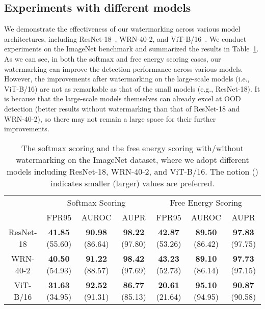 \documentclass{article}
\begin{document}
\subsection{Experiments with different models}

{We demonstrate the effectiveness of our watermarking across various model architectures, including ResNet-18~\cite{he2016deep}, WRN-40-2, and ViT-B/16~\cite{DosovitskiyB0WZ21}. We conduct experiments on the ImageNet benchmark and summarized the results in Table~\ref{tab: vit}. As we can see, in both the softmax and free energy scoring cases, our watermarking can improve the detection performance across various models. However, the improvements after watermarking on the large-scale models (i.e., ViT-B/16) are not as remarkable as that of the small models (e.g., ResNet-18). It is because that the large-scale models themselves can already excel at OOD detection (better results without watermarking than that of ResNet-18 and WRN-40-2), so there may not remain a large space for their further improvements. }

\begin{table}[]
\centering
\caption{{The softmax scoring and the free energy scoring with/without watermarking on the ImageNet dataset, where we adopt different models including ResNet-18, WRN-40-2, and ViT-B/16. The notion  () indicates smaller (larger) values are preferred.}} \label{tab: vit}
\scriptsize{
\begin{tabular}{c|ccc|ccc}
\toprule[1.5pt]
\multicolumn{1}{c|}{\multirow{2}{*}{}} & \multicolumn{3}{c|}{Softmax Scoring}           & \multicolumn{3}{c}{Free Energy Scoring}                   \\
\cline{2-7}
\multicolumn{1}{c|}{}                  & FPR95          & AUROC         & AUPR          & FPR95   & AUROC         & AUPR          \\
\midrule[1pt]
ResNet-18                             & \textbf{41.85} (55.60) & \textbf{90.98} (86.64) & \textbf{98.22} (97.80) & \textbf{42.87} (53.26)             & \textbf{89.50} (86.42) & \textbf{97.83} (97.75) \\
WRN-40-2                              & \textbf{40.50} (54.93) & \textbf{91.22} (88.57) & \textbf{98.42} (97.69) & \textbf{43.23} (52.73)             & \textbf{89.10} (86.14) & \textbf{97.73} (97.15) \\
ViT-B/16                              & \textbf{31.63} (34.95) & \textbf{92.52} (91.31) & \textbf{86.77} (85.13) & \textbf{20.61} (21.64)             & \textbf{95.10} (94.95) & \textbf{90.87} (90.58) \\
\bottomrule[1.5pt]
\end{tabular}}
\end{table}
\end{document}
